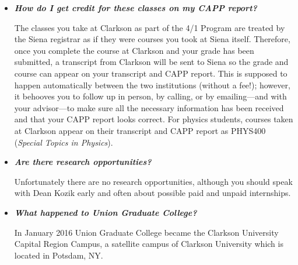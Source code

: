 \documentclass[12pt]{article}
\begin{document}
\begin{itemize}
\item{{\bf {\em How do I get credit for these classes on my CAPP report?}}

The classes you take at Clarkson as part of the 4/1 Program are treated by the
Siena registrar as if they were courses you took at Siena itself.  Therefore,
once you complete the course at Clarkson and your grade has been submitted, a
transcript from Clarkson will be sent to Siena so the grade and course can
appear on your transcript and CAPP report.  This is supposed to happen
automatically between the two institutions (without a fee!); however, it
behooves you to follow up in person, by calling, or by emailing---and with your
advisor---to make sure all the necessary information has been received and that
your CAPP report looks correct.  For physics students, courses taken at Clarkson
appear on their transcript and CAPP report as PHYS400 ({\em Special Topics in
  Physics}).}

\item{{\bf {\em Are there research opportunities?}}

Unfortunately there are no research opportunities, although you should speak
with Dean Kozik early and often about possible paid and unpaid internships.}



\item{{\bf {\em What happened to Union Graduate College?}}

  In January 2016 Union Graduate College became the Clarkson University Capital
  Region Campus, a satellite campus of Clarkson University which is located in
  Potsdam, NY.}
\end{itemize}
  
\end{document}
